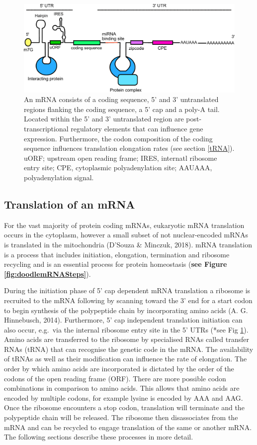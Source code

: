 \documentclass[12pt,openany]{book}
\begin{document}
\begin{figure}
  \includegraphics{./figures/UTRFeatures.pdf}
  \caption{ An mRNA consists of a coding sequence, 5' and 3' untranslated regions flanking the coding sequence, a 5' cap and a poly-A tail. Located within the 5' and 3' untranslated region are post-transcriptional regulatory elements that can influence gene expression. Furthermore, the codon composition of the coding sequence influences translation elongation rates (see section \ref{tRNA}). uORF; upstream open reading frame; IRES, internatl ribosome entry site; CPE, cytoplasmic polyadenylation site; AAUAAA, polyadenylation signal.
 \label{fig:UTRFeat}}
\end{figure}

\clearpage
\subsection{Translation of an mRNA} \label{translation} For the vast
majority of protein coding mRNAs, eukaryotic mRNA translation occurs in
the cytoplasm, however a small subset of not nuclear-encoded mRNAs is
translated in the mitochondria (D'Souza \& Minczuk, 2018). mRNA
translation is a process that includes initiation, elongation,
termination and ribosome recycling and is an essential process for
protein homeostasis (\textbf{see Figure \ref{fig:doodlemRNASteps}}).

During the initiation phase of 5' cap dependent mRNA translation a
ribosome is recruited to the mRNA following by scanning toward the 3'
end for a start codon to begin synthesis of the polypeptide chain by
incorporating amino acids (A. G. Hinnebusch, 2014). Furthermore, 5' cap
independent translation initiation can also occur, e.g.~via the internal
ribosome entry site in the 5' UTRs (*see Fig \ref{fig:UTRFeat}). Amino
acids are transferred to the ribosome by specialised RNAs called
transfer RNAs (tRNA) that can recognise the genetic code in the mRNA.
The availability of tRNAs as well as their modification can influence
the rate of elongation. The order by which amino acids are incorporated
is dictated by the order of the codons of the open reading frame (ORF).
There are more possible codon combinations in comparison to amino acids.
This allows that amino acids are encoded by multiple codons, for example
lysine is encoded by AAA and AAG. Once the ribosome encounters a stop
codon, translation will terminate and the polypeptide chain will be
released. The ribosome then disassociates from the mRNA and can be
recycled to engage translation of the same or another mRNA. The
following sections describe these processes in more detail.
\end{document}
